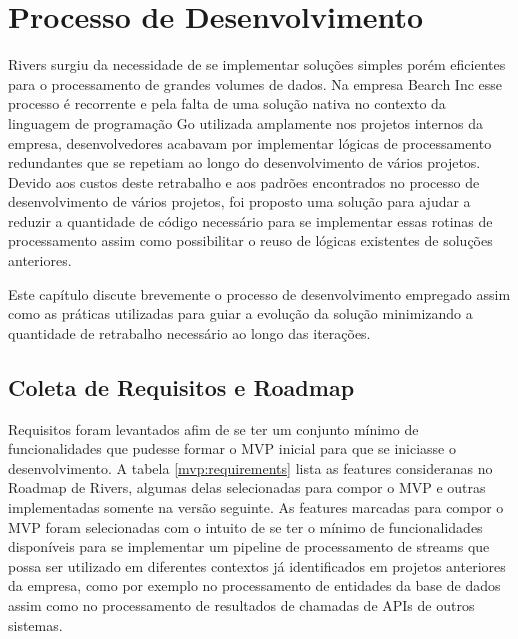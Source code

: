 \chapter{Processo de Desenvolvimento}
\label{cha:rivers_implementation}

Rivers surgiu da necessidade de se implementar soluções simples porém eficientes para o processamento de grandes volumes de dados. Na empresa Bearch Inc esse processo é recorrente e pela falta de uma solução nativa no contexto da linguagem de programação Go utilizada amplamente nos projetos internos da empresa, desenvolvedores acabavam por implementar lógicas de processamento redundantes que se repetiam ao longo do desenvolvimento de vários projetos. Devido aos custos deste retrabalho e aos padrões encontrados no processo de desenvolvimento de vários projetos, foi proposto uma solução para ajudar a reduzir a quantidade de código necessário para se implementar essas rotinas de processamento assim como possibilitar o reuso de lógicas existentes de soluções anteriores.

Este capítulo discute brevemente o processo de desenvolvimento empregado assim como as práticas utilizadas para guiar a evolução da solução minimizando a quantidade de retrabalho necessário ao longo das iterações.

\section{Coleta de Requisitos e Roadmap}
\label{sec:requirements}

Requisitos foram levantados afim de se ter um conjunto mínimo de funcionalidades que pudesse formar o MVP inicial para que se iniciasse o desenvolvimento. A tabela \ref{mvp:requirements} lista as features consideranas no Roadmap de Rivers, algumas delas selecionadas para compor o MVP e outras implementadas somente na versão seguinte. As features marcadas para compor o MVP foram selecionadas com o intuito de se ter o mínimo de funcionalidades disponíveis para se implementar um pipeline de processamento de streams que possa ser utilizado em diferentes contextos já identificados em projetos anteriores da empresa, como por exemplo no processamento de entidades da base de dados assim como no processamento de resultados de chamadas de APIs de outros sistemas.

